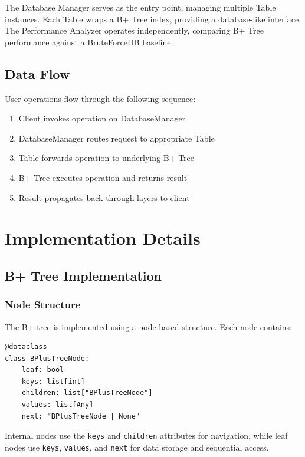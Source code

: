 \documentclass[conference]{IEEEtran}
\begin{document}
The Database Manager serves as the entry point, managing multiple Table instances. Each Table wraps a B+ Tree index, providing a database-like interface. The Performance Analyzer operates independently, comparing B+ Tree performance against a BruteForceDB baseline.

\subsection{Data Flow}

User operations flow through the following sequence:

\begin{enumerate}
    \item Client invokes operation on DatabaseManager
    \item DatabaseManager routes request to appropriate Table
    \item Table forwards operation to underlying B+ Tree
    \item B+ Tree executes operation and returns result
    \item Result propagates back through layers to client
\end{enumerate}

\section{Implementation Details}

\subsection{B+ Tree Implementation}

\subsubsection{Node Structure}

The B+ tree is implemented using a node-based structure. Each node contains:

\begin{lstlisting}[caption=B+ Tree Node Structure]
@dataclass
class BPlusTreeNode:
    leaf: bool
    keys: list[int]
    children: list["BPlusTreeNode"]
    values: list[Any]
    next: "BPlusTreeNode | None"
\end{lstlisting}

Internal nodes use the \texttt{keys} and \texttt{children} attributes for navigation, while leaf nodes use \texttt{keys}, \texttt{values}, and \texttt{next} for data storage and sequential access.
\end{document}
